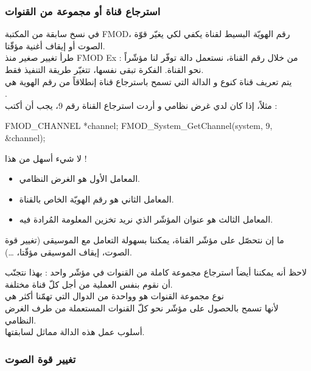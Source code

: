 \subsubsection{استرجاع قناة أو مجموعة من القنوات}

في نسخ سابقة من المكتبة
\textenglish{FMOD}،
رقم الهويّة البسيط لقناة يكفي لكي يغيّر قوّة الصوت أو إيقاف أغنية مؤقّتا.\\
طرأ تغيير صغير منذ
\textenglish{FMOD Ex} :
من خلال رقم القناة، نستعمل دالة توفّر لنا مؤشّراً نحو القناة. الفكرة تبقى نفسها، تتغيّر طريقة التنفيذ فقط.\\
يتم تعريف قناة كنوع
و الدالة التي تسمح باسترجاع قناة إنطلاقاً من رقم الهوية هي\\
.\\
مثلاً، إذا كان لدي غرض نظامي و أردت استرجاع القناة رقم 9، يجب أن أكتب :

\begin{Csource}
FMOD_CHANNEL *channel;
FMOD_System_GetChannel(system, 9, &channel);
\end{Csource}

لا شيء أسهل من هذا !

\begin{itemize}
	\item المعامل الأول هو الغرض النظامي.
	\item المعامل الثاني هو رقم الهويّة الخاص بالقناة.
	\item المعامل الثالث هو عنوان المؤشّر الذي نريد تخزين المعلومة المُرادة فيه.
\end{itemize}

ما إن نتحصّل على مؤشّر القناة، يمكننا بسهولة التعامل مع الموسيقى (تغيير قوة الصوت، إيقاف الموسيقى مؤقّتا، \dots).

لاحظ أنه يمكننا أيضاً استرجاع مجموعة كاملة من القنوات في مؤشّر واحد : بهذا نتجنّب أن نقوم بنفس العملية من أجل كلّ قناة مختلفة.\\
نوع مجموعة القنوات هو
وواحدة من الدوال التي تهمّنا أكثر هي\\
لأنها تسمح بالحصول على مؤشّر نحو كلّ القنوات المستعملة من طرف الغرض النظامي.\\
أسلوب عمل هذه الدالة مماثل لسابقتها.

\subsubsection{تغيير قوة الصوت}

